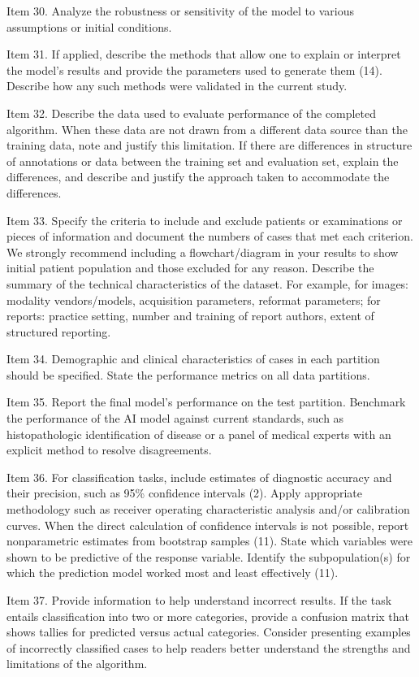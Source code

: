 Item 30. Analyze the robustness or sensitivity of the model to various assumptions or initial conditions.

Item 31. If applied, describe the methods that allow one to explain or interpret the model’s results and provide the parameters used to generate them (14). Describe how any such methods were validated in the current study.

Item 32. Describe the data used to evaluate performance of the completed algorithm. When these data are not drawn from a different data source than the training data, note and justify this limitation. If there are differences in structure of annotations or data between the training set and evaluation set, explain the differences, and describe and justify the approach taken to accommodate the differences.

Item 33. Specify the criteria to include and exclude patients or examinations or pieces of information and document the numbers of cases that met each criterion. We strongly recommend including a flowchart/diagram in your results to show initial patient population and those excluded for any reason. Describe the summary of the technical characteristics of the dataset. For example, for images: modality vendors/models, acquisition parameters, reformat parameters; for reports: practice setting, number and training of report authors, extent of structured reporting.

Item 34. Demographic and clinical characteristics of cases in each partition should be specified. State the performance metrics on all data partitions.

Item 35. Report the final model’s performance on the test partition. Benchmark the performance of the AI model against current standards, such as histopathologic identification of disease or a panel of medical experts with an explicit method to resolve disagreements.

Item 36. For classification tasks, include estimates of diagnostic accuracy and their precision, such as 95\% confidence intervals (2). Apply appropriate methodology such as receiver operating characteristic analysis and/or calibration curves. When the direct calculation of confidence intervals is not possible, report nonparametric estimates from bootstrap samples (11). State which variables were shown to be predictive of the response variable. Identify the subpopulation(s) for which the prediction model worked most and least effectively (11).

Item 37. Provide information to help understand incorrect results. If the task entails classification into two or more categories, provide a confusion matrix that shows tallies for predicted versus actual categories. Consider presenting examples of incorrectly classified cases to help readers better understand the strengths and limitations of the algorithm.

